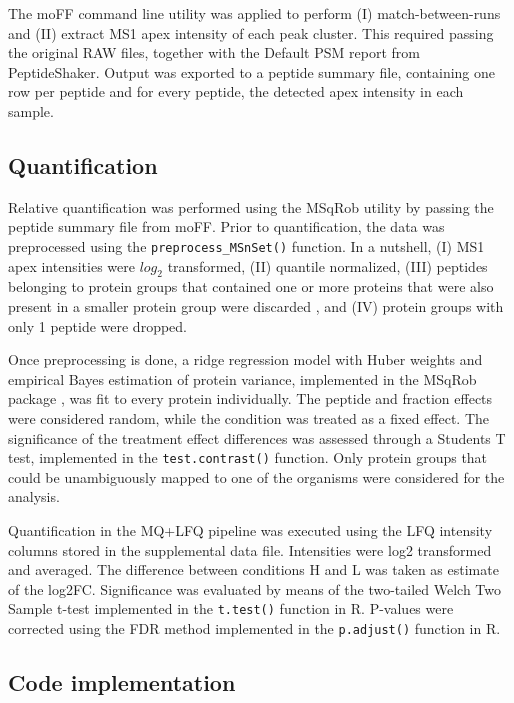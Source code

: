 \documentclass[11pt, a4paper]{report}
\begin{document}
The moFF command line utility \cite{Argentini2016} was applied to perform (I) match-between-runs and (II) extract MS1 apex intensity of each peak cluster. This required passing the original RAW files, together with the Default PSM report from PeptideShaker. Output was exported to a peptide summary file, containing  one row per peptide and for every peptide, the detected apex intensity in each sample.

\subsection{Quantification}

Relative quantification was performed using the MSqRob utility by passing the peptide summary file from moFF. Prior to quantification, the data was preprocessed using the \texttt{preprocess\_MSnSet()} function. In a nutshell, (I) MS1 apex intensities were $log_2$ transformed, (II) quantile normalized, (III) peptides belonging to protein groups that contained one or more proteins that were also present in a smaller protein group were discarded \cite{Goeminne2016}, and (IV) protein groups with only 1 peptide were dropped.

Once preprocessing is done, a ridge regression model with Huber weights and empirical Bayes estimation of protein variance, implemented in the MSqRob package \cite{Goeminne2016}, was fit to every protein individually. The peptide and fraction effects were considered random, while the condition was treated as a fixed effect. The significance of the treatment effect differences was assessed through a Student\textquotesingle s T test, implemented in the \texttt{test.contrast()} function. Only protein groups that could be unambiguously mapped to one of the organisms were considered for the analysis.

Quantification in the MQ+LFQ pipeline was executed using the LFQ intensity columns stored in the supplemental data file. Intensities were log2 transformed and averaged. The difference between conditions H and L was taken as estimate of the log2FC. Significance was evaluated by means of the two-tailed Welch Two Sample t-test implemented in the \texttt{t.test()} function in R. P-values were corrected using the FDR method implemented in the \texttt{p.adjust()} function in R.


\subsection{Code implementation}
\end{document}
